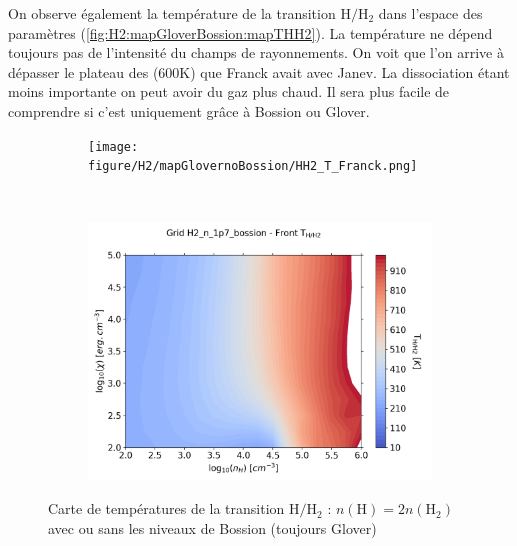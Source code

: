 On observe également la température de la transition $\mathrm{H}/\mathrm{H}_2$ dans l'espace des paramètres (\autoref{fig:H2:mapGloverBossion:mapTHH2}). La température ne dépend toujours pas de l'intensité du champs de rayonnements. On voit que l'on arrive à dépasser le plateau des (600K) que Franck avait avec Janev. La dissociation étant moins importante on peut avoir du gaz plus chaud. Il sera plus facile de comprendre si c'est uniquement grâce à Bossion ou Glover. \newline 

\begin{figure}[th!]
    \centering
    \begin{subfigure}[t]{0.45\textwidth} %
        \centering \texttt{[image: figure/H2/mapGlovernoBossion/HH2\_T\_Franck.png]}
        \caption{}
    \end{subfigure}
    ~ 
    \begin{subfigure}[t]{0.45\textwidth}
        \centering \includegraphics[trim = {0 0 0 0},clip,width=1\textwidth]{figure/H2/mapGloverBossion/HH2_T_Franck.png}
        \caption{}
    \end{subfigure}
    \caption{Carte de températures de la transition $\mathrm{H}/\mathrm{H}_2$ : $n(\mathrm{H})=2n(\mathrm{H}_2)$ avec ou sans les niveaux de Bossion (toujours Glover)}
    \label{fig:H2:mapGloverBossion:mapTHH2}
\end{figure}

